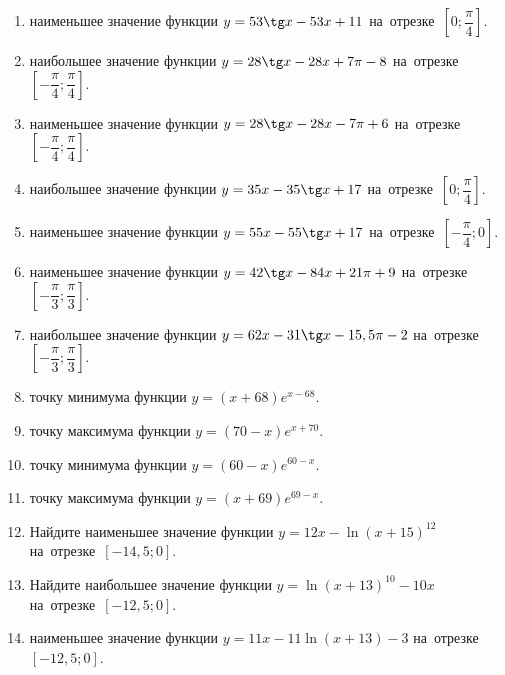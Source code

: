 \documentclass[a4paper,10pt]{article}
\begin{document}
\begin{enumerate}
\item {} наименьшее значение функции $y = 53\tg x-53x+11$ на~отрезке~$\left[0;\dfrac{\pi }{4}\right]$.

\item {} наибольшее значение функции $y=28\tg x-28x+7\pi -8$ на~отрезке~$\left[-\dfrac{\pi }{4};\dfrac{\pi }{4}\right]$.

\item {} наименьшее значение функции $y=28\tg x-28x-7\pi +6$ на~отрезке~$\left[-\dfrac{\pi }{4};\dfrac{\pi }{4}\right]$.

\item {} наибольшее значение функции $y = 35x-35\tg x +17$ на~отрезке~$\left[0;\dfrac{\pi }{4}\right]$.

\item {} наименьшее значение функции $y = 55x-55\tg x +17$ на~отрезке~$\left[-\dfrac{\pi }{4};0\right]$.

\item {} наименьшее значение функции $y = 42\tg x-84x+21 \pi +9$ на~отрезке~$\left[-\dfrac{\pi }{3};\dfrac{\pi }{3}\right]$.

\item {} наибольшее значение функции $y = 62x-31\tg x-15,5\pi -2$ на~отрезке~$\left[-\dfrac{\pi }{3};\dfrac{\pi }{3}\right]$.

\item {} точку минимума функции $y = \left(x+68\right)e^{x-68}$.

\item {} точку максимума функции $y = \left(70-x\right)e^{x+70}$.

\item {} точку минимума функции $y = \left(60-x\right)e^{60-x}$.

\item {} точку максимума функции $y = \left(x+69\right)e^{69-x}$.

\item Найдите наименьшее значение функции $y = 12x-\ln \left(x+15\right)^{12}$ на~отрезке~$\left[-14,5;0\right]$.

\item Найдите наибольшее значение функции $y = \ln \left(x+13\right)^{10}-10x$ на~отрезке~$\left[-12,5;0\right]$.

\item {} наименьшее значение функции $y = 11x-11\ln \left(x+13\right) -3$ на~отрезке~$\left[-12,5;0\right]$.


\end{enumerate}
\end{document}
